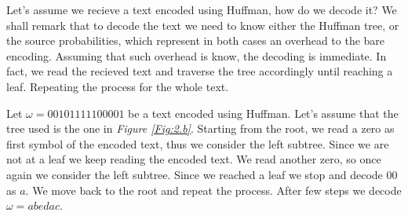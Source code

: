 \documentclass{subfiles}
\begin{document}
    Let's assume we recieve a text encoded using Huffman, how do we decode it?
    We shall remark that to decode the text we need to know either the Huffman tree, 
        or the source probabilities, which represent in both cases an overhead
        to the bare encoding.
    Assuming that such overhead is know, the decoding is immediate.
    In fact, we read the recieved text and traverse the tree accordingly 
    until reaching a leaf. Repeating the process for the whole text.

    \begin{example*}
        Let \(\omega = 00101111100001\) be a text encoded using Huffman.
        Let's assume that the tree used is the one in \emph{Figure \ref{Fig:2.b}}.
        Starting from the root, we read a zero as first symbol of the encoded text,
        thus we consider the left subtree. 
        Since we are not at a leaf we keep reading the encoded text.
        We read another zero, so once again we consider the left subtree.
        Since we reached a leaf we stop and decode \(00\) as \(a\). 
        We move back to the root and repeat the process. 
        After few steps we decode \(\omega = abedac\).
    \end{example*}
\end{document}
